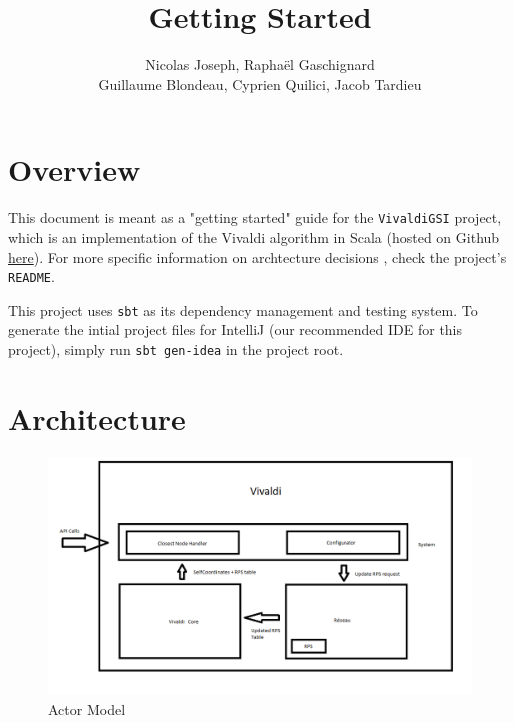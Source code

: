 \documentclass[11pt,a4paper]{article}
\title{Getting Started}
\author{Nicolas Joseph, Raphaël Gaschignard\\ Guillaume Blondeau, Cyprien Quilici, Jacob Tardieu}
\begin{document}
\maketitle

\section{Overview}
  This document is meant as a "getting started" guide for the \texttt{VivaldiGSI} project, which is an implementation of the Vivaldi algorithm in Scala (hosted on Github \href{https://github.com/BeyondTheClouds/VivaldiGSI}{here}). For more specific information on archtecture decisions , check the project's \verb|README|.
  
    This project uses \verb|sbt| as its dependency management and testing system. To generate the intial project files for IntelliJ (our recommended IDE for this project), simply run \verb|sbt gen-idea| in the project root.
    
\section{Architecture}

\begin{figure}[h]
   \includegraphics[scale=0.4]{VivaldiArchitecture}
   \caption{\label{acteur} Actor Model}
\end{figure}
\end{document}

